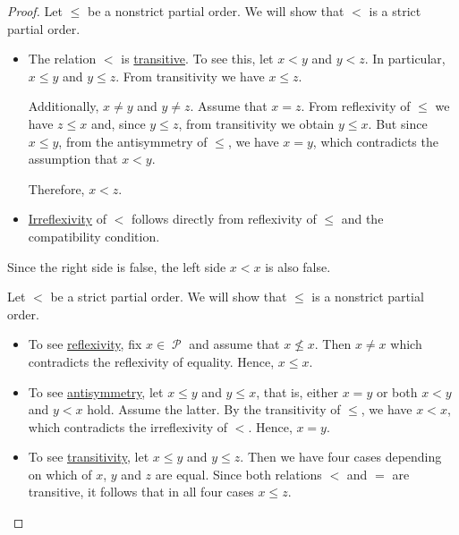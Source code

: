 \begin{proof}
   Let \( \leq \) be a nonstrict partial order. We will show that \( < \) is a strict partial order.

  \begin{itemize}
    \item The relation \( < \) is \hyperref[def:binary_relation/transitive]{transitive}. To see this, let \( x < y \) and \( y < z \). In particular, \( x \leq y \) and \( y \leq z \). From transitivity we have \( x \leq z \).

    Additionally, \( x \neq y \) and \( y \neq z \). Assume that \( x = z \). From reflexivity of \( \leq \) we have \( z \leq x \) and, since \( y \leq z \), from transitivity we obtain \( y \leq x \). But since \( x \leq y \), from the antisymmetry of \( \leq \), we have \( x = y \), which contradicts the assumption that \( x < y \).

    Therefore, \( x < z \).

    \item \hyperref[def:binary_relation/irreflexive]{Irreflexivity} of \( < \) follows directly from reflexivity of \( \leq \) and the compatibility condition.
  \end{itemize}

  Since the right side is false, the left side \( x < x \) is also false.

   Let \( < \) be a strict partial order. We will show that \( \leq \) is a nonstrict partial order.

  \begin{itemize}
    \item To see \hyperref[def:binary_relation/reflexive]{reflexivity}, fix \( x \in \mscrP \) and assume that \( x \not\leq x \). Then \( x \neq x \) which contradicts the reflexivity of equality. Hence, \( x \leq x \).

    \item To see \hyperref[def:binary_relation/antisymmetric]{antisymmetry}, let \( x \leq y \) and \( y \leq x \), that is, either \( x = y \) or both \( x < y \) and \( y < x \) hold. Assume the latter. By the transitivity of \( \leq \), we have \( x < x \), which contradicts the irreflexivity of \( < \). Hence, \( x = y \).

    \item To see \hyperref[def:binary_relation/transitive]{transitivity}, let \( x \leq y \) and \( y \leq z \). Then we have four cases depending on which of \( x \), \( y \) and \( z \) are equal. Since both relations \( < \) and \( = \) are transitive, it follows that in all four cases \( x \leq z \).
  \end{itemize}
\end{proof}

